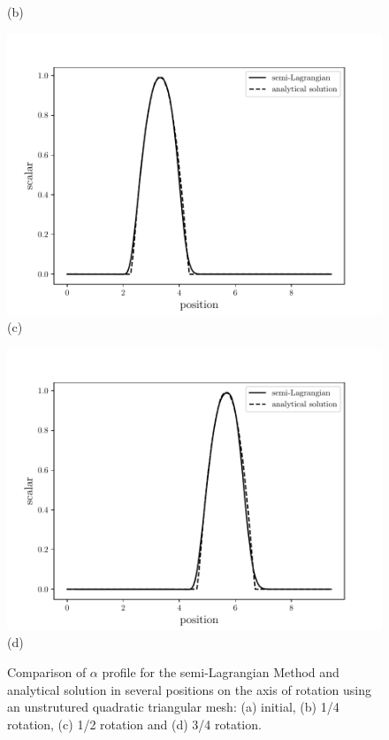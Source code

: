 \begin{center}
\begin{figure}[H]
\begin{minipage}{.5\linewidth}
      (b)
     \end{minipage}
     \begin{minipage}{.5\linewidth}
      \centering
      \includegraphics[scale=0.53]{./02_chaps/cap_validation/figure/SLquad2.pdf}\\
      (c)
     \end{minipage}%
     \begin{minipage}{.5\linewidth}
      \centering
      \includegraphics[scale=0.53]{./02_chaps/cap_validation/figure/SLquad3.pdf}\\
      (d)
     \end{minipage}
     \medskip
     \caption{Comparison of $\alpha$ profile for the semi-Lagrangian Method and analytical solution in several positions on the axis of rotation using an unstrutured quadratic triangular mesh: 
     (a) initial, 
     (b) 1/4 rotation,
     (c) 1/2 rotation and
     (d) 3/4 rotation.}
     \label{SL quad}
\end{figure}
\end{center}






